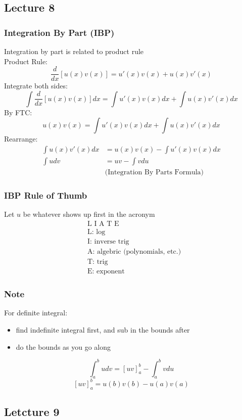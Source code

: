 \documentclass[12pt, letterpaper]{article}
\begin{document}
\subsection{Lecture 8}
\subsubsection{Integration By Part (IBP)}
Integration by part is related to product rule \\
Product Rule: \[\frac{d}{dx}[u(x)v(x)] =  u'(x)v(x) + u(x)v'(x)\]
Integrate both sides: \[\int\frac{d}{dx}[u(x)v(x)]dx = \int u'(x)v(x)dx + \int u(x)v'(x)dx\]
By FTC: \[u(x)v(x) = \int u'(x)v(x)dx + \int u(x)v'(x)dx\]
Rearrange: 
\begin{align*}
    \int u(x)v'(x)dx &= u(x)v(x) - \int u'(x)v(x)dx \\
    \int udv &= uv - \int vdu \\
    &\text{(Integration By Parts Formula)}
\end{align*}
\subsubsection{IBP Rule of Thumb}
Let $u$ be whatever shows up first in the acronym
\begin{align*}
    &\text{L I A T E} \\
    &\text{L: log} \\
    &\text{I: inverse trig} \\
    &\text{A: algebric (polynomials, etc.)} \\
    &\text{T: trig} \\
    &\text{E: exponent}
\end{align*}
\subsubsection*{Note}
For definite integral: 
\begin{itemize}
    \item find indefinite integral first, and sub in the bounds after
    \item do the bounds as you go along
\end{itemize}
\[\int_{a}^{b}udv = [uv]_a^b - \int_{a}^{b}vdu\]
\[[uv]_a^b = u(b)v(b) - u(a)v(a)\]
\subsection{Letcture 9}
\end{document}
